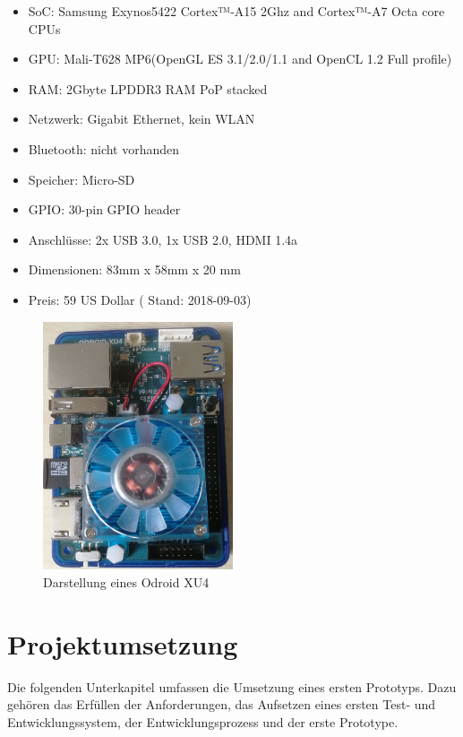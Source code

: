 \documentclass[titlepage]{report}
\begin{document}
\begin{itemize}
    \item SoC: Samsung Exynos5422 Cortex™-A15 2Ghz and Cortex™-A7 Octa core CPUs
    \item GPU: Mali-T628 MP6(OpenGL ES 3.1/2.0/1.1 and OpenCL 1.2 Full profile)
    \item RAM: 2Gbyte LPDDR3 RAM PoP stacked
    \item Netzwerk: Gigabit Ethernet, kein WLAN
    \item Bluetooth: nicht vorhanden
    \item Speicher: Micro-SD
    \item GPIO: 30-pin GPIO header\cite{ODROID_GPIO}
    \item Anschlüsse: 2x USB 3.0, 1x USB 2.0, HDMI 1.4a
    \item Dimensionen: 83mm x 58mm x 20 mm
    \item Preis: 59 US Dollar\cite{ODROID_PRICE} ( Stand: 2018-09-03)
\end{itemize}
\begin{figure}[H]
    \centering
    \includegraphics[width=0.5\textwidth]{figures/odroid.jpg}
    \caption{Darstellung eines Odroid XU4}\label{fig:odroid}
\end{figure}
\chapter*{Projektumsetzung}
Die folgenden Unterkapitel umfassen die Umsetzung eines ersten
Prototyps. Dazu gehören das Erfüllen der Anforderungen, das Aufsetzen
eines ersten Test- und Entwicklungssystem, der Entwicklungsprozess
und der erste Prototype.
\end{document}
